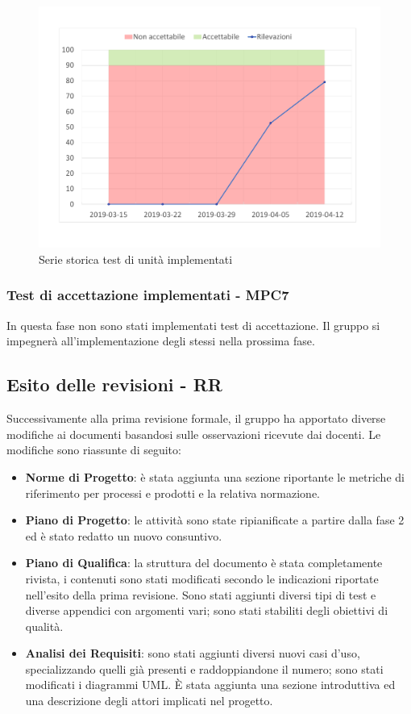 \begin{figure}[H]
	\centering
	\includegraphics[scale=0.6]{images/resoconto/MPC6Chart.pdf}
	\caption{Serie storica test di unità implementati}	
\end{figure}

\subsubsection{Test di accettazione implementati - MPC7}
In questa fase non sono stati implementati test di accettazione.
Il gruppo si impegnerà all'implementazione degli stessi nella prossima fase.
\newpage
\subsection{Esito delle revisioni - RR}
Successivamente alla prima revisione formale, il gruppo ha apportato diverse modifiche ai documenti basandosi sulle osservazioni ricevute dai docenti. Le modifiche sono riassunte di seguito:
	\begin{itemize}
		\item \textbf{Norme di Progetto}: è stata aggiunta una sezione riportante le metriche di riferimento per processi e prodotti e la relativa normazione. 
		\item \textbf{Piano di Progetto}: le attività sono state ripianificate a partire dalla fase 2 ed è stato redatto un nuovo consuntivo.
		\item \textbf{Piano di Qualifica}: la struttura del documento è stata completamente rivista, i contenuti sono stati modificati secondo le indicazioni riportate nell'esito della prima revisione. Sono stati aggiunti diversi tipi di test e diverse appendici con argomenti vari; sono stati stabiliti degli obiettivi di qualità.
		\item \textbf{Analisi dei Requisiti}: sono stati aggiunti diversi nuovi casi d'uso, specializzando quelli già presenti e raddoppiandone il numero; sono stati modificati i diagrammi UML. \`E stata aggiunta una sezione introduttiva ed una descrizione degli attori implicati nel progetto. 
	\end{itemize}

